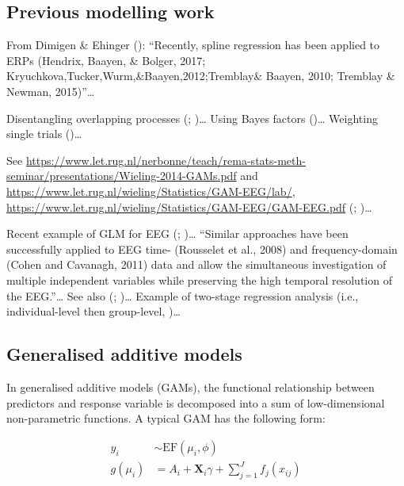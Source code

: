 \documentclass[
  doc,
  floatsintext,
  longtable,
  a4paper,
  nolmodern,
  notxfonts,
  notimes,
  colorlinks=true,linkcolor=blue,citecolor=blue,urlcolor=blue]{apa7}
\begin{document}
\subsection{Previous modelling work}\label{previous-modelling-work}

From Dimigen \& Ehinger (): ``Recently,
spline regression has been applied to ERPs (Hendrix, Baayen, \& Bolger,
2017; Kryuchkova,Tucker,Wurm,\&Baayen,2012;Tremblay\& Baayen, 2010;
Tremblay \& Newman, 2015)''\ldots{}

Disentangling overlapping processes
(;
)\ldots{}
Using Bayes factors ()\ldots{} Weighting single trials ()\ldots{}

See
\url{https://www.let.rug.nl/nerbonne/teach/rema-stats-meth-seminar/presentations/Wieling-2014-GAMs.pdf}
and \url{https://www.let.rug.nl/wieling/Statistics/GAM-EEG/lab/},
\url{https://www.let.rug.nl/wieling/Statistics/GAM-EEG/GAM-EEG.pdf}
(;
)\ldots{}

Recent example of GLM for EEG (; )\ldots{} ``Similar approaches have been successfully applied to
EEG time- (Rousselet et al., 2008) and frequency-domain (Cohen and
Cavanagh, 2011) data and allow the simultaneous investigation of
multiple independent variables while preserving the high temporal
resolution of the EEG.''\ldots{} See also (; )\ldots{} Example of two-stage regression analysis (i.e.,
individual-level then group-level, )\ldots{}

\subsection{Generalised additive
models}\label{generalised-additive-models}

In generalised additive models (GAMs), the functional relationship
between predictors and response variable is decomposed into a sum of
low-dimensional non-parametric functions. A typical GAM has the
following form:

\[
\begin{aligned} 
y_{i} &\sim \mathrm{EF}\left(\mu_{i}, \phi\right)\\
g\left(\mu_i\right) &= A_{i} + \mathbf{X}_{i} \gamma + \sum_{j=1}^{J} f_{j}\left(x_{ij}\right)
\end{aligned}
\]
\end{document}
